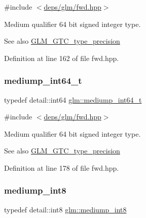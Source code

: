 {\ttfamily \#include $<$\hyperlink{fwd_8hpp}{deps/glm/fwd.\+hpp}$>$}

Medium qualifier 64 bit signed integer type. \begin{DoxySeeAlso}{See also}
\hyperlink{group__gtc__type__precision}{G\+L\+M\+\_\+\+G\+T\+C\+\_\+type\+\_\+precision} 
\end{DoxySeeAlso}


Definition at line 162 of file fwd.\+hpp.

\mbox{\label{group__gtc__type__precision_ga555a2f85641550c232db473a9bb981f7}} 
\subsubsection{\texorpdfstring{mediump\+\_\+int64\+\_\+t}{mediump\_int64\_t}}
{\footnotesize\ttfamily typedef detail\+::int64 \hyperlink{group__gtc__type__precision_ga555a2f85641550c232db473a9bb981f7}{glm\+::mediump\+\_\+int64\+\_\+t}}



{\ttfamily \#include $<$\hyperlink{fwd_8hpp}{deps/glm/fwd.\+hpp}$>$}

Medium qualifier 64 bit signed integer type. \begin{DoxySeeAlso}{See also}
\hyperlink{group__gtc__type__precision}{G\+L\+M\+\_\+\+G\+T\+C\+\_\+type\+\_\+precision} 
\end{DoxySeeAlso}


Definition at line 178 of file fwd.\+hpp.

\mbox{\label{group__gtc__type__precision_ga3ee8faab2278c44c5785af04b7b18a14}} 
\subsubsection{\texorpdfstring{mediump\+\_\+int8}{mediump\_int8}}
{\footnotesize\ttfamily typedef detail\+::int8 \hyperlink{group__gtc__type__precision_ga3ee8faab2278c44c5785af04b7b18a14}{glm\+::mediump\+\_\+int8}}



